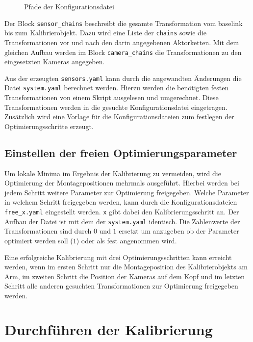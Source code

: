 \begin{figure}[htpb]
  \centering
  \def\svgwidth{.5\textwidth}
  
  \caption{Pfade der Konfigurationsdatei}
  \label{fig:ketten}
\end{figure}

Der Block \texttt{sensor\_chains} beschreibt die gesamte Transformation vom \ac{baselink}
bis zum Kalibrierobjekt. Dazu wird eine Liste der \texttt{chains} sowie die
Transformationen vor und nach den darin angegebenen Aktorketten. Mit dem gleichen
Aufbau werden im Block \texttt{camera\_chains} die Transformationen zu den 
eingesetzten Kameras angegeben.

Aus der erzeugten \texttt{sensors.yaml} kann durch die angewandten Änderungen
die Datei \texttt{system.yaml} berechnet werden. Hierzu werden die benötigten
festen Transformationen von einem Skript ausgelesen und umgerechnet. Diese
Transformationen werden in die gesuchte Konfigurationsdatei eingetragen.
Zusätzlich wird eine Vorlage für die Konfigurationsdateien zum festlegen
der Optimierungsschritte erzeugt.

\subsection{Einstellen der freien Optimierungsparameter}
\label{sub:Einstellen der freien Optimierungsparameter}

Um lokale Minima im Ergebnis der Kalibrierung zu vermeiden, wird die Optimierung
der Montagepositionen mehrmals ausgeführt. Hierbei werden bei jedem Schritt 
weitere Parameter zur Optimierung freigegeben. Welche Parameter in welchem 
Schritt freigegeben werden, kann durch die Konfigurationsdateien
\texttt{free\_x.yaml} eingestellt werden. \texttt{x} gibt dabei den Kalibrierungsschritt an.
Der Aufbau der Datei ist mit dem der \texttt{system.yaml} identisch. Die
Zahlenwerte der Transformationen sind durch $0$ und $1$ ersetzt um anzugeben ob
der Parameter optimiert werden soll ($1$) oder als fest angenommen wird.

Eine erfolgreiche Kalibrierung mit drei Optimierungsschritten kann erreicht 
werden, wenn im ersten Schritt nur die Montageposition des Kalibrierobjekts 
am Arm, im zweiten Schritt die Position der Kameras auf dem Kopf und im letzten 
Schritt alle anderen gesuchten Transformationen zur Optimierung freigegeben 
werden.



\section{Durchführen der Kalibrierung}
\label{sec:Durchführen der Kalibrierung}

